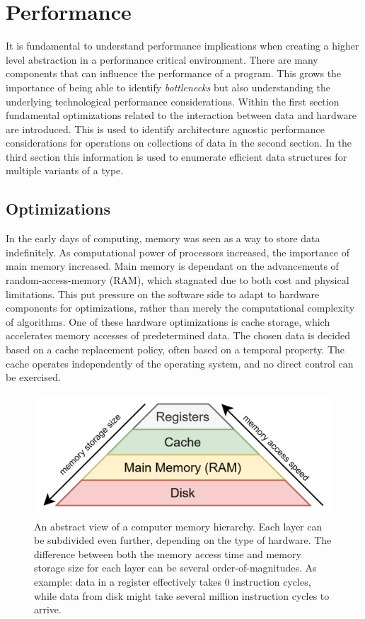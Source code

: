\documentclass{article}
\begin{document}
\newpage

\section{Performance}

It is fundamental to understand performance implications when creating a higher level abstraction in a performance critical environment.
There are many components that can influence the performance of a program.
This grows the importance of being able to identify {\it bottlenecks} but also understanding the underlying technological performance considerations.
Within the first section fundamental optimizations related to the interaction between data and hardware are introduced.
This is used to identify architecture agnostic performance considerations for operations on collections of data in the second section.
In the third section this information is used to enumerate efficient data structures for multiple variants of a type.

\subsection{Optimizations}

In the early days of computing, memory was seen as a way to store data indefinitely.
As computational power of processors increased, the importance of main memory increased.
Main memory is dependant on the advancements of random-access-memory (RAM), which stagnated due to both cost and physical limitations\cite{memory}. 
This put pressure on the software side to adapt to hardware components for optimizations, rather than merely the computational complexity of algorithms.
One of these hardware optimizations is cache storage, which accelerates memory accesses of predetermined data.
The chosen data is decided based on a cache replacement policy, often based on a temporal property. 
The cache operates independently of the operating system\cite{memory}, and no direct control can be exercised.

\begin{figure}[ht]
    \centering
    \includegraphics[scale=0.2]{memoryhierarchy}
    \caption
    {
        An abstract view of a computer memory hierarchy. 
        Each layer can be subdivided even further, depending on the type of hardware. 
        The difference between both the memory access time and memory storage size for each layer can be several order-of-magnitudes.
        As example: data in a register effectively takes 0 instruction cycles, while data from disk might take several million instruction cycles to arrive.  
    }
\end{figure}
\end{document}
